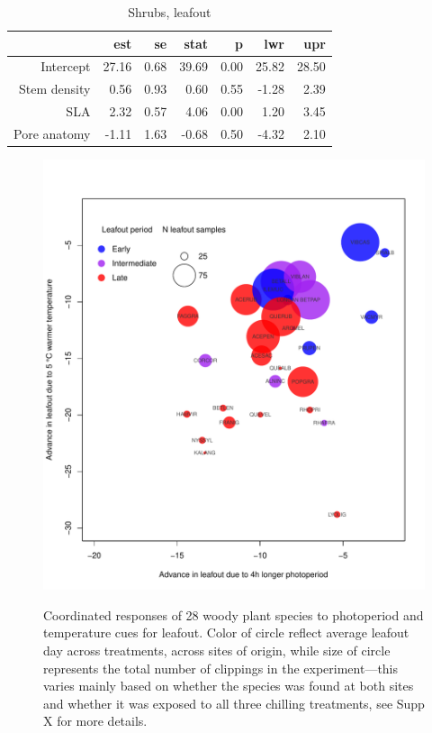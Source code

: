 \documentclass{article}
\begin{document}
\begin{table}[ht]
\centering
\caption{Shrubs, leafout} 
\begin{tabular}{rrrrrrr}
  \hline
 & est & se & stat & p & lwr & upr \\ 
  \hline
Intercept & 27.16 & 0.68 & 39.69 & 0.00 & 25.82 & 28.50 \\ 
  Stem density & 0.56 & 0.93 & 0.60 & 0.55 & -1.28 & 2.39 \\ 
  SLA & 2.32 & 0.57 & 4.06 & 0.00 & 1.20 & 3.45 \\ 
  Pore anatomy & -1.11 & 1.63 & -0.68 & 0.50 & -4.32 & 2.10 \\ 
   \hline
\end{tabular}
\end{table}

\begin{figure} %
\begin{center}
\caption{Coordinated responses of 28 woody plant species to photoperiod and temperature cues for leafout. Color of circle reflect average leafout day across treatments, across sites of origin, while size of circle represents the total number of clippings in the experiment---this varies mainly based on whether the species was found at both sites and whether it was exposed to all three chilling treatments, see Supp X for more details.} %
\includegraphics[scale=0.5]{Advplot2}
\label{fig1}
\end{center}
\end{figure}
\end{document}
